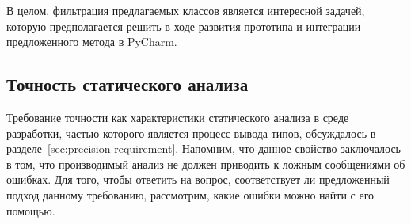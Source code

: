 В целом, фильтрация предлагаемых классов является интересной задачей, которую
предполагается решить в ходе развития прототипа и интеграции предложенного
метода в PyCharm.

\subsection{Точность статического анализа}
\label{sub:static-analysis-precision}

Требование точности как характеристики статического анализа в среде разработки,
частью которого является процесс вывода типов, обсуждалось в
разделе~\ref{sec:precision-requirement}. Напомним, что данное свойство
заключалось в том, что производимый анализ не должен приводить к ложным
сообщениями об ошибках. Для того, чтобы ответить на вопрос, соответствует ли
предложенный подход данному требованию, рассмотрим, какие ошибки можно найти с
его помощью. 

